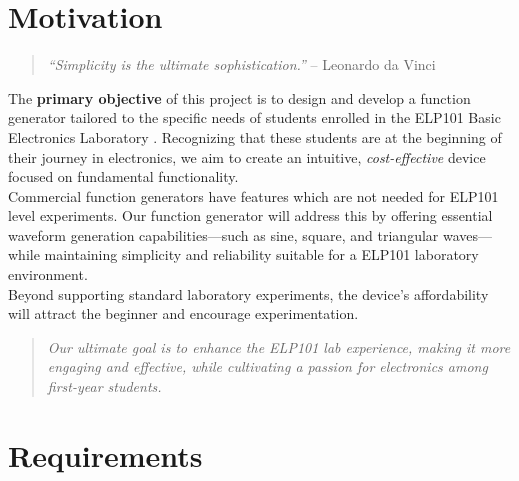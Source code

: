 \documentclass[12pt,a4paper]{article}
\begin{document}
\section{Motivation}
\begin{quote}

    \textit{``Simplicity is the ultimate sophistication.''}  
    \hfill -- Leonardo da Vinci\\
\end{quote}

The \textbf{primary objective} of this project is to design and develop a function generator tailored to the specific needs of students enrolled in the ELP101 Basic Electronics Laboratory \parencite{dixit_lab_manual}. Recognizing that these students are at the beginning of their journey in electronics, we aim to create an intuitive, \textit{cost-effective} device focused on fundamental functionality.\\
Commercial function generators have features which are not needed for ELP101 level experiments. Our function generator will address this by offering essential waveform generation capabilities—such as sine, square, and triangular waves—while maintaining simplicity and reliability suitable for a ELP101 laboratory environment.\\
Beyond supporting standard laboratory experiments, the device's affordability will attract the beginner and encourage experimentation.

\begin{quote}
    \textit{Our ultimate goal is to enhance the ELP101 lab experience, making it more engaging and effective, while cultivating a passion for electronics among first-year students.}
\end{quote}

\section{Requirements}
\end{document}
